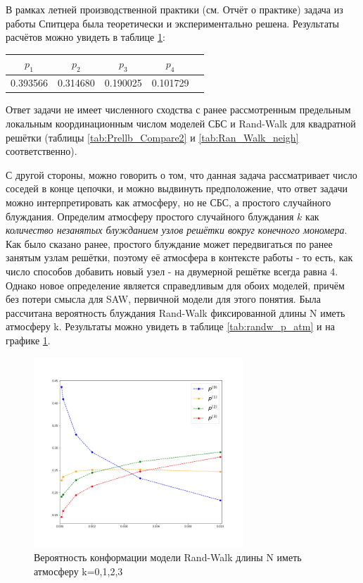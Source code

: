 В рамках летней производственной практики (см. Отчёт о практике) задача из работы Спитцера была теоретически и экспериментально решена. 
Результаты расчётов можно увидеть в таблице \ref{tab:Spitser_res}:

\begin{table}[h]
	\centering
	\begin{tabular}{|c|c|c|c|c|}
	\hline
	$p_1$ &  $p_2$ & $p_3$ &  $p_4$ \\ \hline
 	0.393566 & 0.314680 & 0.190025 & 0.101729 \\ \hline
	\end{tabular}
	\label{tab:Spitser_res}
\end{table}

Ответ задачи не имеет численного сходства с ранее рассмотренным предельным локальным координационным числом моделей СБС и Rand-Walk для квадратной решётки (таблицы \ref{tab:Prellb_Compare2} и \ref{tab:Ran_Walk_neigh} соответственно).

С другой стороны, можно говорить о том, что данная задача рассматривает число соседей в конце цепочки, и можно выдвинуть предположение,
что ответ задачи можно интерпретировать как атмосферу, но не СБС, а простого случайного блуждания. 
Определим атмосферу простого случайного блуждания $k$ как \textit{количество незанятых блужданием узлов решётки вокруг конечного мономера}.
Как было сказано ранее, простого блуждание может передвигаться по ранее занятым узлам решётки, поэтому её атмосфера в контексте работы \cite{owczarek2008scaling} - то есть, как число способов добавить новый узел - на двумерной решётке всегда равна 4. 
Однако новое определение является справедливым для обоих моделей, причём без потери смысла для SAW, первичной модели для этого понятия.
Была рассчитана вероятность блуждания Rand-Walk фиксированной длины N иметь атмосферу k. Результаты можно увидеть в таблице \ref{tab:randw_p_atm} и на графике \ref{fig:randw_p_atm}.

\begin{figure}[h]
\centering
\includegraphics[width=0.7\textwidth]{Sections/Images_2/randwalk_p_atmos.png}
\caption{Вероятность конформации модели Rand-Walk длины N иметь атмосферу k=0,1,2,3}
\label{fig:randw_p_atm}
\end{figure}

